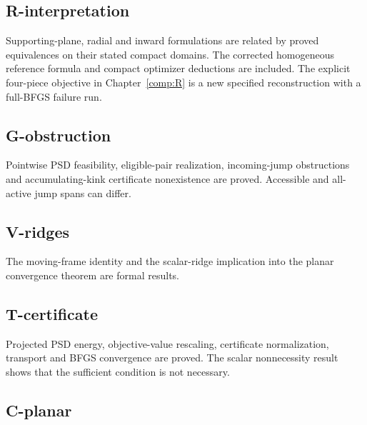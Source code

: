 

\subsection{R-interpretation}\label{r-interpretation}

Supporting-plane, radial and inward formulations are related by proved equivalences on their stated compact domains. The corrected homogeneous reference formula and compact optimizer deductions are included. The explicit four-piece objective in Chapter~\ref{comp:R} is a new specified reconstruction with a full-BFGS failure run.



\subsection{G-obstruction}\label{g-obstruction}

Pointwise PSD feasibility, eligible-pair realization, incoming-jump obstructions and accumulating-kink certificate nonexistence are proved. Accessible and all-active jump spans can differ.



\subsection{V-ridges}\label{v-ridges}

The moving-frame identity and the scalar-ridge implication into the planar convergence theorem are formal results.



\subsection{T-certificate}\label{t-certificate}

Projected PSD energy, objective-value rescaling, certificate normalization, transport and BFGS convergence are proved. The scalar nonnecessity result shows that the sufficient condition is not necessary.



\subsection{C-planar}\label{c-planar}


